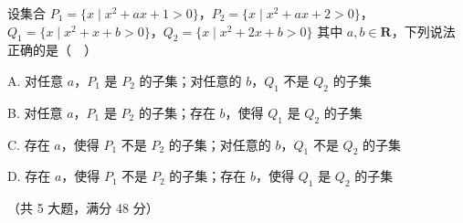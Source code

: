 \begin{question}
设集合 \(P_{1}=\{x\mid x^{2}+ax+1>0\}\)，\(P_{2}=\{x\mid x^{2}+ax+2>0\}\)，\(Q_{1}=\{x\mid x^{2}+x+b>0\}\)，\(Q_{2}=\{x\mid x^{2}+2x+b>0\}\) 其中 \(a,b\in\mathbf{R}\)，下列说法正确的是（　）

A. 对任意 \(a\)，\(P_{1}\) 是 \(P_{2}\) 的子集；对任意的 \(b\)，\(Q_{1}\) 不是 \(Q_{2}\) 的子集

B. 对任意 \(a\)，\(P_{1}\) 是 \(P_{2}\) 的子集；存在 \(b\)，使得 \(Q_{1}\) 是 \(Q_{2}\) 的子集

C. 存在 \(a\)，使得 \(P_{1}\) 不是 \(P_{2}\) 的子集；对任意的 \(b\)，\(Q_{1}\) 不是 \(Q_{2}\) 的子集

D. 存在 \(a\)，使得 \(P_{1}\) 不是 \(P_{2}\) 的子集；存在 \(b\)，使得 \(Q_{1}\) 是 \(Q_{2}\) 的子集

\end{question}

（共 5 大题，满分 48 分）

